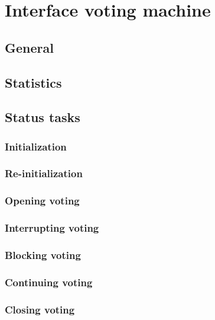 \chapter{Interface voting machine}\label{cha:interf-voting-mach}

\section{General}\label{sec5:general}

\section{Statistics}\label{sec5:statistics}

\section{Status tasks}\label{sec5:status-tasks}

\subsection{Initialization}\label{sec5:initialization}

\subsection{Re-initialization}\label{sec5:re-initialization}

\subsection{Opening voting}\label{sec5:opening-votes}

\subsection{Interrupting voting}\label{sec5:interrupting-voting}

\subsection{Blocking voting}\label{sec5:blocking-voting}

\subsection{Continuing voting}\label{sec5:continuing-voting}

\subsection{Closing voting}\label{sec5:closing-voting}

